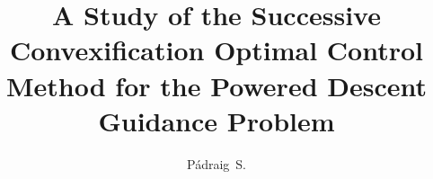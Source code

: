 \documentclass[modernstyle, 11pt]{thesis}
\title{A Study of the Successive Convexification Optimal Control Method for the Powered Descent Guidance Problem}
\author{Pádraig~S.}{Lysandrou}
\begin{document}

	





\nocite{*}						%


\appendix

% 
\end{document}
